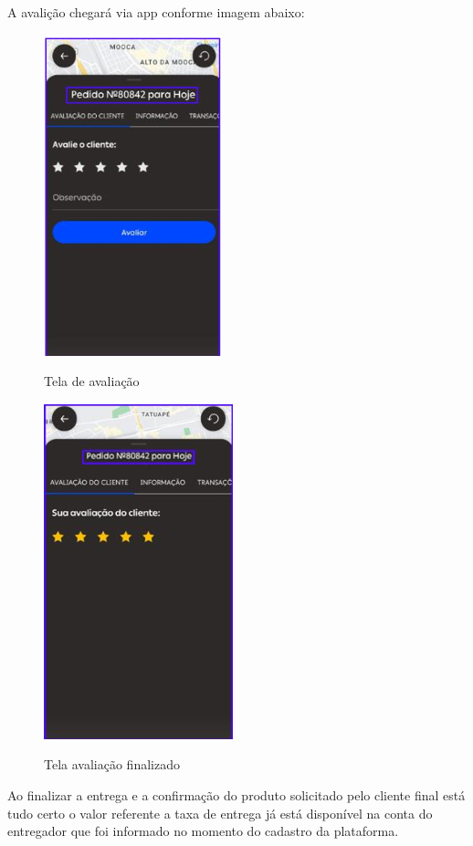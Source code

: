 A avalição chegará via app conforme imagem abaixo:

\begin{figure} [!ht]
   {\centering
    \caption{Tela de avaliação}
    \includegraphics[width=0.5\linewidth]{figuras/avaliacao.png}
    \label{fig:enter-label}
    }
\end{figure}

\begin{figure} [!ht]
   {\centering
    \caption{Tela avaliação finalizado}
    \includegraphics[width=0.5\linewidth]{figuras/image.png}
    \label{fig:enter-label}
    }
\end{figure}

Ao finalizar a entrega e a confirmação do produto solicitado pelo cliente final está tudo certo o valor referente a taxa de entrega já está disponível na conta do entregador que foi informado no momento do cadastro da plataforma.



